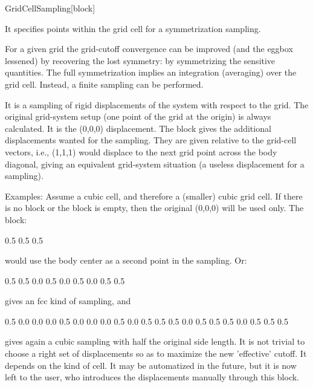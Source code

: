 \begin{fdfentry}{GridCellSampling}[block]

  It specifies points within the grid cell for a symmetrization
  sampling.

  For a given grid the grid-cutoff convergence can be improved (and
  the eggbox lessened) by recovering the lost symmetry: by
  symmetrizing the sensitive quantities. The full symmetrization
  implies an integration (averaging) over the grid cell. Instead, a
  finite sampling can be performed.

  It is a sampling of rigid displacements of the system with respect
  to the grid. The original grid-system setup (one point of the grid
  at the origin) is always calculated. It is the (0,0,0) displacement.
  The block  gives the additional
  displacements wanted for the sampling. They are given relative to
  the grid-cell vectors, i.e., (1,1,1) would displace to the next grid
  point across the body diagonal, giving an equivalent grid-system
  situation (a useless displacement for a sampling).

  Examples: Assume a cubic cell, and therefore a (smaller) cubic grid
  cell.  If there is no block or the block is empty, then the original
  (0,0,0) will be used only. The block:
  \begin{fdfexample}
        0.5    0.5    0.5
  \end{fdfexample}
  would use the body center as a second point in the sampling. Or:
  \begin{fdfexample}
        0.5    0.5    0.0
        0.5    0.0    0.5
        0.0    0.5    0.5
  \end{fdfexample}
  gives an fcc kind of sampling, and
  \begin{fdfexample}
        0.5    0.0    0.0
        0.0    0.5    0.0
        0.0    0.0    0.5
        0.0    0.5    0.5
        0.5    0.0    0.5
        0.5    0.5    0.0
        0.5    0.5    0.5
  \end{fdfexample}
  gives again a cubic sampling with half the original side length.  It
  is not trivial to choose a right set of displacements so as to
  maximize the new 'effective' cutoff. It depends on the kind of
  cell. It may be automatized in the future, but it is now left to the
  user, who introduces the displacements manually through this block.


\end{fdfentry}
